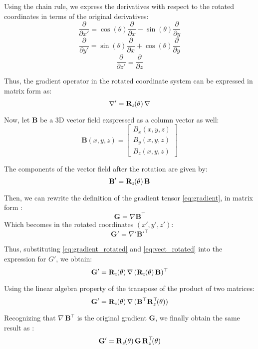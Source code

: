 \noindent
Using the chain rule, we express the derivatives with respect to the rotated coordinates 
in terms of the original derivatives: 
\[
\frac{\partial}{\partial x'} = \cos(\theta) \frac{\partial}{\partial x} 
- \sin(\theta) \frac{\partial}{\partial y}
\]
\[
\frac{\partial}{\partial y'} = \sin(\theta) \frac{\partial}{\partial x} 
+ \cos(\theta) \frac{\partial}{\partial y}
\]
\[
\frac{\partial}{\partial z'} = \frac{\partial}{\partial z}
\]

\noindent
Thus, the gradient operator in the rotated coordinate system 
can be expressed in matrix form as:
\begin{equation}
\nabla' 
= 
\mathbf{R}_z\mkern-2mu(\theta) \, \nabla
\label{eq:gradient_rotated}
\end{equation}

\noindent
Now, let \( \mathbf{B} \) be a 3D vector field exspressed as a column vector as well:
\[
\mathbf{B}(x, y, z) = 
\begin{bmatrix}
    B_x(x, y, z) \\
    B_y(x, y, z) \\
    B_z(x, y, z)
\end{bmatrix}
\]

\noindent
The components of the vector field after the rotation 
are given by:
\begin{equation}
    \mathbf{B}' = \mathbf{R}_z\mkern-2mu(\theta) \, \mathbf{B}
\label{eq:vect_rotated}
\end{equation}

\noindent
Then, we can rewrite the definition of the gradient tensor \ref{eq:gradient},
in matrix form \cite{gradient_tensor_rotated}:
\[
\mathbf{G} = \nabla \mathbf{B}^\top
\]
Which becomes in the rotated coordinates $(x', y', z')$:
\[
\mathbf{G}' = \nabla' \mathbf{B}'^\top
\]

\noindent
Thus, substituting \ref{eq:gradient_rotated} and \ref{eq:vect_rotated}
into the expression for \( G' \), we obtain:
\[
\mathbf{G}' = \mathbf{R}_z\mkern-2mu(\theta) \,  \nabla \, (\mathbf{R}_z\mkern-2mu(\theta) \, \mathbf{B})^\top
\]

\noindent
Using the linear algebra property of the transpose of the product of two matrices:
\[
\mathbf{G}' = \mathbf{R}_z\mkern-2mu(\theta) \, \nabla \, (\mathbf{B}^\top {\mathbf{R}}^\top_z\mkern-3.5mu(\theta))
\]

\noindent
Recognizing that \( \nabla \, \mathbf{B}^\top \) is the original gradient 
\( \mathbf{G} \), we finally obtain the same result as \cite{gradient_tensor_rotated}:
\begin{equation}
    \mathbf{G}' = \mathbf{R}_z\mkern-2mu(\theta) \, \mathbf{G} \, {\mathbf{R}}^\top_z\mkern-3.5mu(\theta)
    \label{eq:rotated_gradient_tensor}
\end{equation}

